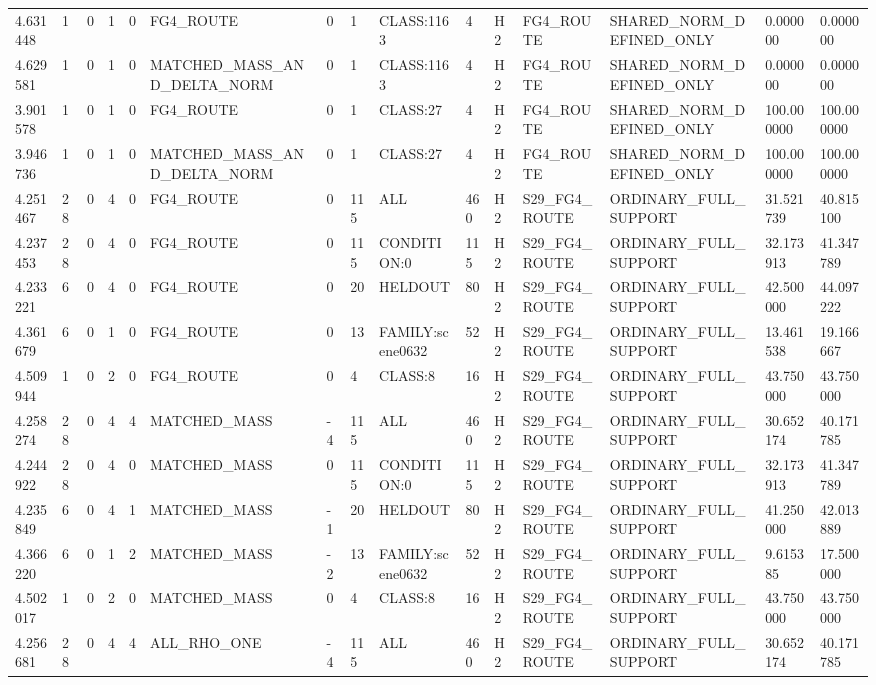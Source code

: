 \begin{tabular}{lllllllllllllll}
4.631448 & 1 & 0 & 1 & 0 & FG4\_ROUTE & 0 & 1 & CLASS:1163 & 4 & H2 & FG4\_ROUTE & SHARED\_NORM\_DEFINED\_ONLY & 0.000000 & 0.000000 \\
4.629581 & 1 & 0 & 1 & 0 & MATCHED\_MASS\_AND\_DELTA\_NORM & 0 & 1 & CLASS:1163 & 4 & H2 & FG4\_ROUTE & SHARED\_NORM\_DEFINED\_ONLY & 0.000000 & 0.000000 \\
3.901578 & 1 & 0 & 1 & 0 & FG4\_ROUTE & 0 & 1 & CLASS:27 & 4 & H2 & FG4\_ROUTE & SHARED\_NORM\_DEFINED\_ONLY & 100.000000 & 100.000000 \\
3.946736 & 1 & 0 & 1 & 0 & MATCHED\_MASS\_AND\_DELTA\_NORM & 0 & 1 & CLASS:27 & 4 & H2 & FG4\_ROUTE & SHARED\_NORM\_DEFINED\_ONLY & 100.000000 & 100.000000 \\
4.251467 & 28 & 0 & 4 & 0 & FG4\_ROUTE & 0 & 115 & ALL & 460 & H2 & S29\_FG4\_ROUTE & ORDINARY\_FULL\_SUPPORT & 31.521739 & 40.815100 \\
4.237453 & 28 & 0 & 4 & 0 & FG4\_ROUTE & 0 & 115 & CONDITION:0 & 115 & H2 & S29\_FG4\_ROUTE & ORDINARY\_FULL\_SUPPORT & 32.173913 & 41.347789 \\
4.233221 & 6 & 0 & 4 & 0 & FG4\_ROUTE & 0 & 20 & HELDOUT & 80 & H2 & S29\_FG4\_ROUTE & ORDINARY\_FULL\_SUPPORT & 42.500000 & 44.097222 \\
4.361679 & 6 & 0 & 1 & 0 & FG4\_ROUTE & 0 & 13 & FAMILY:scene0632 & 52 & H2 & S29\_FG4\_ROUTE & ORDINARY\_FULL\_SUPPORT & 13.461538 & 19.166667 \\
4.509944 & 1 & 0 & 2 & 0 & FG4\_ROUTE & 0 & 4 & CLASS:8 & 16 & H2 & S29\_FG4\_ROUTE & ORDINARY\_FULL\_SUPPORT & 43.750000 & 43.750000 \\
4.258274 & 28 & 0 & 4 & 4 & MATCHED\_MASS & -4 & 115 & ALL & 460 & H2 & S29\_FG4\_ROUTE & ORDINARY\_FULL\_SUPPORT & 30.652174 & 40.171785 \\
4.244922 & 28 & 0 & 4 & 0 & MATCHED\_MASS & 0 & 115 & CONDITION:0 & 115 & H2 & S29\_FG4\_ROUTE & ORDINARY\_FULL\_SUPPORT & 32.173913 & 41.347789 \\
4.235849 & 6 & 0 & 4 & 1 & MATCHED\_MASS & -1 & 20 & HELDOUT & 80 & H2 & S29\_FG4\_ROUTE & ORDINARY\_FULL\_SUPPORT & 41.250000 & 42.013889 \\
4.366220 & 6 & 0 & 1 & 2 & MATCHED\_MASS & -2 & 13 & FAMILY:scene0632 & 52 & H2 & S29\_FG4\_ROUTE & ORDINARY\_FULL\_SUPPORT & 9.615385 & 17.500000 \\
4.502017 & 1 & 0 & 2 & 0 & MATCHED\_MASS & 0 & 4 & CLASS:8 & 16 & H2 & S29\_FG4\_ROUTE & ORDINARY\_FULL\_SUPPORT & 43.750000 & 43.750000 \\
4.256681 & 28 & 0 & 4 & 4 & ALL\_RHO\_ONE & -4 & 115 & ALL & 460 & H2 & S29\_FG4\_ROUTE & ORDINARY\_FULL\_SUPPORT & 30.652174 & 40.171785 \\

\end{tabular}
